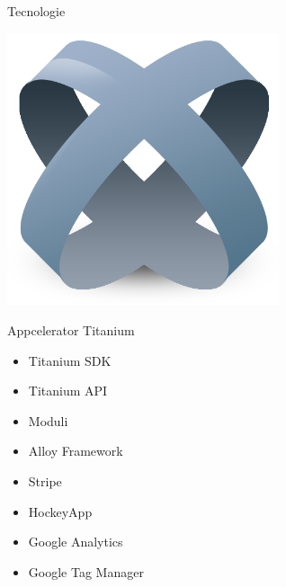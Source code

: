 	\subsection{}
		\begin{frame}{Tecnologie}
			\begin{minipage}{\textwidth}
				\begin{minipage}{0.49\textwidth}
					\includegraphics[width=0.6\textwidth]{capitolo_2/immagini/titanium.png}
				\end{minipage}
				\begin{minipage}{0.49\textwidth}
					\begin{block}{Appcelerator Titanium}
						\begin{itemize}
							\item Titanium SDK
							\item Titanium API
							\item Moduli
							\item Alloy Framework
						\end{itemize}
					\end{block}
				\end{minipage}\par
			\end{minipage}\par
			\vspace{3mm}
			\begin{minipage}{\textwidth}
				\begin{minipage}{0.49\textwidth}
					\begin{itemize}
						\item Stripe
						\item HockeyApp
						\item Google Analytics
						\item Google Tag Manager

\end{itemize}
\end{minipage}
\end{minipage}
\end{frame}

